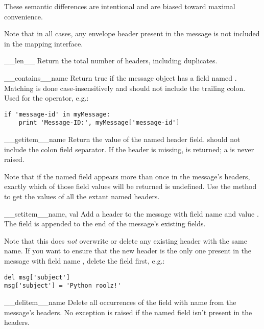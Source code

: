 These semantic differences are intentional and are biased toward
maximal convenience.

Note that in all cases, any envelope header present in the message is
not included in the mapping interface.

\begin{methoddesc}[Message]{__len__}{}
Return the total number of headers, including duplicates.
\end{methoddesc}

\begin{methoddesc}[Message]{__contains__}{name}
Return true if the message object has a field named .
Matching is done case-insensitively and  should not include the
trailing colon.  Used for the  operator,
e.g.:

\begin{verbatim}
if 'message-id' in myMessage:
    print 'Message-ID:', myMessage['message-id']
\end{verbatim}
\end{methoddesc}

\begin{methoddesc}[Message]{__getitem__}{name}
Return the value of the named header field.   should not
include the colon field separator.  If the header is missing,
 is returned; a  is never raised.

Note that if the named field appears more than once in the message's
headers, exactly which of those field values will be returned is
undefined.  Use the  method to get the values of all
the extant named headers.
\end{methoddesc}

\begin{methoddesc}[Message]{__setitem__}{name, val}
Add a header to the message with field name  and value
.  The field is appended to the end of the message's existing
fields.

Note that this does \emph{not} overwrite or delete any existing header
with the same name.  If you want to ensure that the new header is the
only one present in the message with field name
, delete the field first, e.g.:

\begin{verbatim}
del msg['subject']
msg['subject'] = 'Python roolz!'
\end{verbatim}
\end{methoddesc}

\begin{methoddesc}[Message]{__delitem__}{name}
Delete all occurrences of the field with name  from the
message's headers.  No exception is raised if the named field isn't
present in the headers.
\end{methoddesc}

